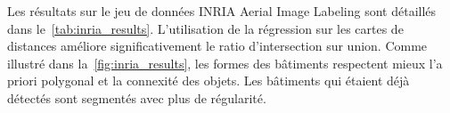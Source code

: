 Les résultats sur le jeu de données INRIA Aerial Image Labeling sont détaillés dans le~\cref{tab:inria_results}. L'utilisation de la régression sur les cartes de distances améliore significativement le ratio d'intersection sur union. Comme illustré dans la~\cref{fig:inria_results}, les formes des bâtiments respectent mieux l'a priori polygonal et la connexité des objets. Les bâtiments qui étaient déjà détectés sont segmentés avec plus de régularité.

